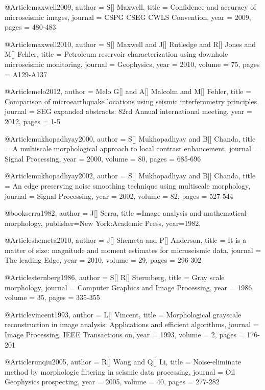      @Article{maxwell2009,
  author = 	 {S[] Maxwell},
  title = 	 {Confidence and accuracy of microseismic images},
  journal = 	 {CSPG CSEG CWLS Convention},
  year = 	 2009,
  pages = 	 {480-483}}   
  
    
     @Article{maxwell2010,
  author = 	 {S[] Maxwell and J[] Rutledge and R[] Jones and M[] Fehler},
  title = 	 {Petroleum reservoir characterization using downhole microseismic monitoring},
  journal = 	 {Geophysics},
  year = 	 2010,
  volume = 	 75,
  pages = 	 {A129-A137}}  


     @Article{melo2012,
  author = 	 {Melo G[] and A[] Malcolm and M[] Fehler},
  title = 	 {Comparison of microearthquake locations using seismic interferometry principles},
  journal = 	 {SEG expanded abstracts: 82rd Annual international meeting},
  year = 	 2012,
  pages = 	 {1-5}}  
  
      @Article{mukhopadhyay2000,
  author = 	 {S[] Mukhopadhyay and B[] Chanda},
  title = 	 {A multiscale morphological approach to local contrast enhancement},
  journal = 	 {Signal Processing},
  year = 	 2000,
  volume = 	 80,
  pages = 	 {685-696}} 


      @Article{mukhopadhyay2002,
  author = 	 {S[] Mukhopadhyay and B[] Chanda},
  title = 	 {An edge preserving noise smoothing technique using
multiscale morphology},
  journal = 	 {Signal Processing},
  year = 	 2002,
  volume = 	 82,
  pages = 	 {527-544}} 
  
  
@book{serra1982,
  author = {J[] Serra},
  title ={Image analysis and mathematical morphology},
  publisher={New York:Academic Press},
  year=1982,
}

       @Article{shemeta2010,
  author = 	 {J[] Shemeta and P[] Anderson},
  title = 	 {It is a matter of size: magnitude and moment estimates for microseismic data},
  journal = 	 {The leading Edge},
  year = 	 2010,
  volume = 	 29,
  pages = 	 {296-302}} 
  
         @Article{sternberg1986,
  author = 	 {S[] R[] Stermberg},
  title = 	 {Gray scale morphology},
  journal = 	 {Computer Graphics and Image Processing},
  year = 	 1986,
  volume = 	 35,
  pages = 	 {335-355}}  
  
          @Article{vincent1993,
  author = 	 {L[] Vincent},
  title = 	 {Morphological grayscale reconstruction in image analysis: Applications and efficient algorithms},
  journal = 	 {Image Processing, IEEE Transactions on},
  year = 	 1993,
  volume = 	 2,
  pages = 	 {176-201}}  
  
          @Article{runqiu2005,
  author = 	 {R[] Wang and Q[] Li},
  title = 	 {Noise-eliminate method by morphologic filtering in seismic data processing},
  journal = 	 {Oil Geophysics prospecting},
  year = 	 2005,
  volume = 	 40,
  pages = 	 {277-282}}  
  
